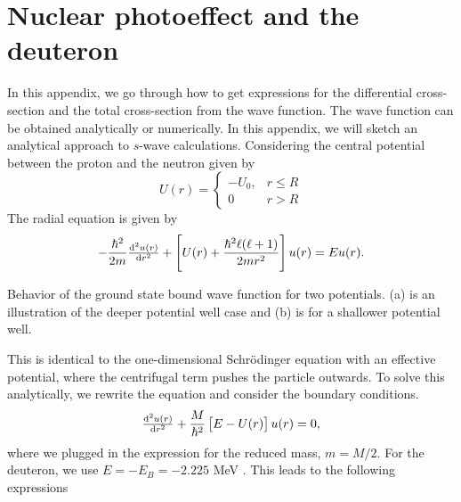 \appendix

\chapter{Nuclear photoeffect and the deuteron}\label{app:deuteron}
In this appendix, we go through how to get expressions for the differential cross-section and the total cross-section from the wave function. The wave function can be obtained analytically or numerically. In this appendix, we will sketch an analytical approach to $s$-wave calculations. 
Considering the central potential between the proton and the neutron given by
\[ U(r)= \begin{cases}
	-U_0, & r \leq R \\
	0 & r > R
\end{cases}
\]
The radial equation is given by
\begin{equation}
	-\frac{\hbar^2}{2m} \od[2]{u(r)}{r}+\left[U(r)+\frac{\hbar^2 \ell(\ell+1)}{2mr^2} \right]u(r)=Eu(r).
\end{equation}
\begin{marginfigure}
	\centering
	
	\caption{Behavior of the ground state bound wave function for two potentials. (a) is an illustration of the deeper potential well case and (b) is for a shallower potential well. }
\end{marginfigure}
This is identical to the one-dimensional Schrödinger equation with an effective potential, where the centrifugal term pushes the particle outwards. To solve this analytically, we rewrite the equation and consider the boundary conditions.
\begin{equation} \label{SEnew}
	\od[2]{u(r)}{r}+\frac{M}{\hbar^2} \left[E-U(r) \right]u(r)=0,
\end{equation}
where we plugged in the expression for the reduced mass, $m=M/2$. For the deuteron, we use $E=-E_B = -2.225$ MeV \cite{KerneII}. This leads to the following expressions

